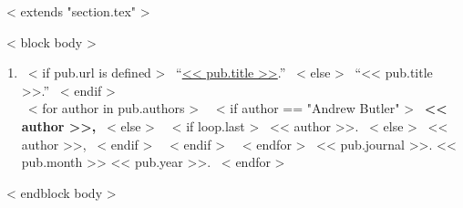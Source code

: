 ~< extends "section.tex" >~

~< block body >~
  \begin{enumerate}
    \itemsep 1em
    ~< for pub in items >~
      \item{
        ~< if pub.url is defined >~
          ``\href{<< pub.url >>}{<< pub.title >>}.''
        ~< else >~
          ``<< pub.title >>.''
        ~< endif >~\\
      	~< for author in pub.authors >~
      		~< if author == "Andrew Butler" >~
      			\textbf{ << author >>, }
      		~< else >~
            ~< if loop.last >~
              << author >>. 
            ~< else >~
              << author >>, 
            ~< endif >~
          ~< endif >~
      	~< endfor >~
        << pub.journal >>.
        << pub.month >>
        << pub.year >>.
      }
    ~< endfor >~
  \end{enumerate}
~< endblock body >~
